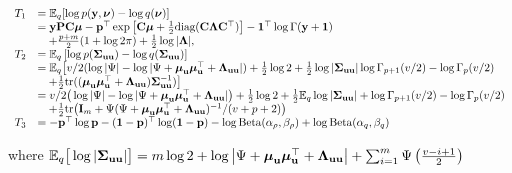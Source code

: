 \documentclass{article}[12pt]
\begin{document}
$$
\begin{array}{rl}
T_1 &= {\mathbb E}_q[\log{p({\bf y}, {\boldsymbol\nu})} - \log{q({\boldsymbol\nu})}] \\
&= {\bf y} {\bf P} {\bf C} {\boldsymbol \mu} - {\bf p}^\top \exp{\left[ {\bf C}{\boldsymbol\mu}+ {\frac{1}{2}}\text{diag} ({\bf C}{\boldsymbol\Lambda}{\bf C}^\top) \right]} - {\bf 1}^\top\log \Gamma{({\bf y}+ {\bf1})}\\
& \quad + \frac{p + m}{2} (1 + \log{2 \pi}) + {\frac{1}{2}} \log{|{\boldsymbol\Lambda}|}, \\
T_2 &= {\mathbb E}_q \left[ \log p({\boldsymbol \Sigma}_{{\bf u} {\bf u}}) - \log q({\boldsymbol \Sigma}_{{\bf u} {\bf u}}) \right] \\
&= {\mathbb E}_q \big[ v/2(\log |\Psi| - \log |\Psi + {\boldsymbol \mu}_{\bf u} {\boldsymbol \mu}_{\bf u}^\top + {\boldsymbol \Lambda}_{{\bf u} {\bf u}}|) + {\frac{1}{2}} \log 2 + {\frac{1}{2}} \log|{\boldsymbol \Sigma}_{{\bf u} {\bf u}}| \log \Gamma_{p+1}(v/2) - \log \Gamma_{p}(v/2)\\
&\quad + {\frac{1}{2}} \text{tr}(({\boldsymbol \mu}_{{\bf u}} {\boldsymbol \mu}_{{\bf u}}^\top + {\boldsymbol \Lambda}_{{\bf u} {\bf u}}) {\boldsymbol \Sigma}_{{\bf u} {\bf u}}^{-1}) \big] \\
&= v/2\big(\log |\Psi| - \log |\Psi + {\boldsymbol \mu}_{\bf u} {\boldsymbol \mu}_{\bf u}^\top + {\boldsymbol \Lambda}_{{\bf u} {\bf u}}|\big) + {\frac{1}{2}} \log 2 + {\frac{1}{2}} {\mathbb E}_q \log |{\boldsymbol \Sigma}_{{\bf u} {\bf u}}| + \log \Gamma_{p+1}(v/2) - \log \Gamma_{p}(v/2) \\
&\quad + {\frac{1}{2}} \text{tr}\big({\bf I}_m + \Psi(\Psi+ {\boldsymbol \mu}_{\bf u} {\boldsymbol \mu}_{\bf u}^\top + {\boldsymbol \Lambda}_{{\bf u} {\bf u}})^{-1}/(v + p + 2)\big) \\
T_3 &= - {\bf p}^\top \log {\bf p} - ({\bf 1} - {\bf p})^\top \log ({\bf 1} - {\bf p}) - \log \text{Beta} (\alpha_\rho, \beta_\rho) + \log \text{Beta} (\alpha_q, \beta_q)
\end{array}
$$

where ${\mathbb E}_q \big[ \log |{\boldsymbol \Sigma}_{{\bf u} {\bf u}}| \big] = m \log 2 + \log \left | \Psi + {\boldsymbol \mu}_{\bf u} {\boldsymbol \mu}_{\bf u}^\top + {\boldsymbol \Lambda}_{{\bf u} {\bf u}} \right | + \sum_{i=1}^m \Psi \left ( \frac{v - i + 1}{2} \right )$



\end{document}
